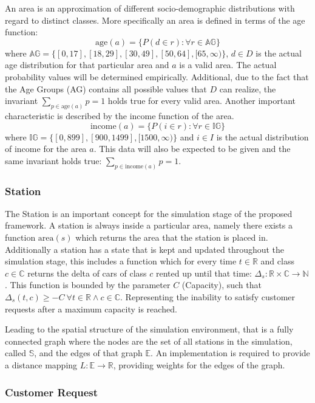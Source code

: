 An area is an approximation of different socio-demographic distributions with regard to 
distinct classes. More specifically an area is defined in terms of the age function:
$$
\text{age}(a) = \{ P(d \in r): \forall r \in \mathbb{AG} \}
$$
where $\mathbb{AG} = \{ [0,17], [18,29], [30,49], [50,64], [65,\infty) \}$, $d \in D$ is the
actual age distribution for that particular area and $a$ is a valid area. The actual probability 
values will be determined empirically. Additional, due to the fact that the
Age Groups (AG) contains all possible values that $D$ can realize, the invariant 
$\sum_{p \in \text{age}(a)} p = 1$ holds true for every valid area. Another important 
characteristic is described by the income function of the area.
$$
\text{income}(a) = \{ P(i \in r): \forall r \in \mathbb{IG} \}
$$
where $\mathbb{IG} = \{ [0,899], [900, 1499], [1500, \infty) \}$ and $i \in I$ is the actual distribution
of income for the area $a$. This data will also be expected to be given and the same invariant holds true:
$\sum_{p \in \text{income}(a)} p = 1$.

\subsubsection{Station}
\label{sub_sec:Method/Concepts/Station}

The Station is an important concept for the simulation stage of the proposed framework. A station is always
inside a particular area, namely there exists a function $\text{area}(s)$ which returns the area that the 
station is placed in. Additionally a station has a state that is kept and updated throughout the simulation
stage, this includes a function which for every time $t \in \mathbb{R}$ and class $c \in \mathbb{C}$ returns
the delta of cars of class $c$ rented up until that time: $\Delta_s: \mathbb{R} \times \mathbb{C} \to \mathbb{N}$. This function
is bounded by the parameter $C$ (Capacity), such that $\Delta_s(t, c) \ge -C \ \forall t \in \mathbb{R} \land c \in \mathbb{C}$.
Representing the inability to satisfy customer requests after a maximum capacity is reached.

Leading to the spatial structure of the simulation environment, that is a fully connected graph where the nodes are 
the set of all stations in the simulation, called $\mathbb{S}$, and the edges of that graph $\mathbb{E}$. An implementation
is required to provide a distance mapping $L: \mathbb{E} \to \mathbb{R}$, providing weights for the edges of the graph.

\subsubsection{Customer Request}
\label{sub_sec:Method/Concepts/Request}


